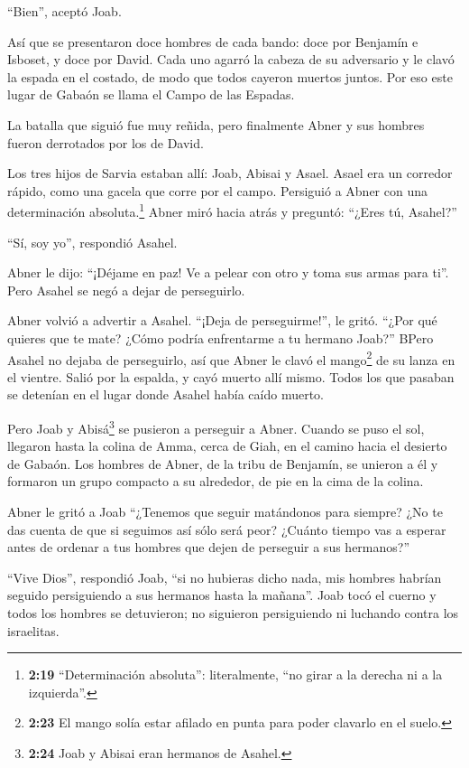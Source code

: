 ``Bien'', aceptó Joab.

 Así que se presentaron doce hombres de cada bando: doce
por Benjamín e Isboset, y doce por David.  Cada uno agarró
la cabeza de su adversario y le clavó la espada en el costado, de modo
que todos cayeron muertos juntos. Por eso este lugar de Gabaón se llama
el Campo de las Espadas.

 La batalla que siguió fue muy reñida, pero finalmente
Abner y sus hombres fueron derrotados por los de David.

 Los tres hijos de Sarvia estaban allí: Joab, Abisai y
Asael. Asael era un corredor rápido, como una gacela que corre por el
campo.  Persiguió a Abner con una determinación
absoluta.\footnote{\textbf{2:19} ``Determinación absoluta'':
  literalmente, ``no girar a la derecha ni a la izquierda''.}
 Abner miró hacia atrás y preguntó: ``¿Eres tú, Asahel?''

``Sí, soy yo'', respondió Asahel.

 Abner le dijo: ``¡Déjame en paz! Ve a pelear con otro y
toma sus armas para ti''. Pero Asahel se negó a dejar de perseguirlo.

 Abner volvió a advertir a Asahel. ``¡Deja de
perseguirme!'', le gritó. ``¿Por qué quieres que te mate? ¿Cómo podría
enfrentarme a tu hermano Joab?''  BPero Asahel no dejaba de
perseguirlo, así que Abner le clavó el mango\footnote{\textbf{2:23} El
  mango solía estar afilado en punta para poder clavarlo en el suelo.}
de su lanza en el vientre. Salió por la espalda, y cayó muerto allí
mismo. Todos los que pasaban se detenían en el lugar donde Asahel había
caído muerto.

 Pero Joab y Abisá\footnote{\textbf{2:24} Joab y Abisai
  eran hermanos de Asahel.} se pusieron a perseguir a Abner. Cuando se
puso el sol, llegaron hasta la colina de Amma, cerca de Giah, en el
camino hacia el desierto de Gabaón.  Los hombres de Abner,
de la tribu de Benjamín, se unieron a él y formaron un grupo compacto a
su alrededor, de pie en la cima de la colina.

 Abner le gritó a Joab ``¿Tenemos que seguir matándonos
para siempre? ¿No te das cuenta de que si seguimos así sólo será peor?
¿Cuánto tiempo vas a esperar antes de ordenar a tus hombres que dejen de
perseguir a sus hermanos?''

 ``Vive Dios'', respondió Joab, ``si no hubieras dicho
nada, mis hombres habrían seguido persiguiendo a sus hermanos hasta la
mañana''.  Joab tocó el cuerno y todos los hombres se
detuvieron; no siguieron persiguiendo ni luchando contra los israelitas.

